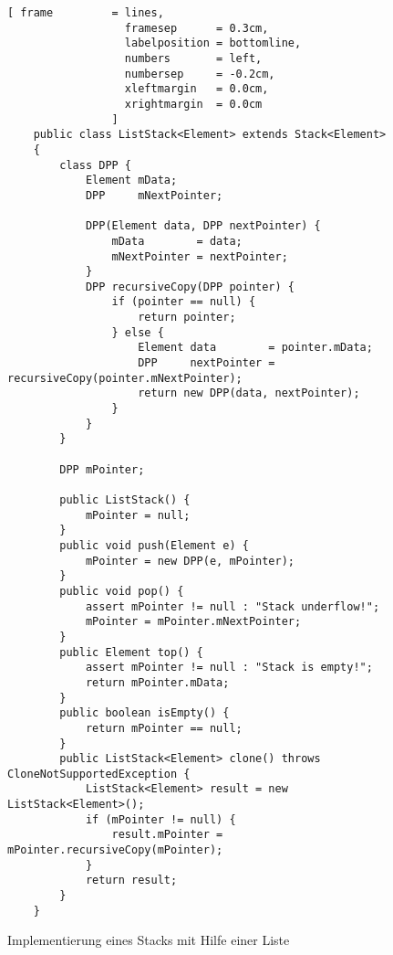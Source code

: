 \begin{figure}[!h]
  \centering
\begin{Verbatim}[ frame         = lines, 
                  framesep      = 0.3cm, 
                  labelposition = bottomline,
                  numbers       = left,
                  numbersep     = -0.2cm,
                  xleftmargin   = 0.0cm,
                  xrightmargin  = 0.0cm
                ]
    public class ListStack<Element> extends Stack<Element>
    {
        class DPP {
            Element mData;
            DPP     mNextPointer;

            DPP(Element data, DPP nextPointer) {
                mData        = data;
                mNextPointer = nextPointer;
            }            
            DPP recursiveCopy(DPP pointer) {
                if (pointer == null) {
                    return pointer;
                } else {
                    Element data        = pointer.mData;
                    DPP     nextPointer = recursiveCopy(pointer.mNextPointer);
                    return new DPP(data, nextPointer);
                }
            }
        }    

        DPP mPointer;
        
        public ListStack() {
            mPointer = null;
        }
        public void push(Element e) {
            mPointer = new DPP(e, mPointer);
        }        
        public void pop() {
            assert mPointer != null : "Stack underflow!";
            mPointer = mPointer.mNextPointer;
        }
        public Element top() {
            assert mPointer != null : "Stack is empty!";
            return mPointer.mData;
        }
        public boolean isEmpty() {
            return mPointer == null;
        }       
        public ListStack<Element> clone() throws CloneNotSupportedException {
            ListStack<Element> result = new ListStack<Element>();
            if (mPointer != null) {
                result.mPointer = mPointer.recursiveCopy(mPointer);
            }
            return result;
        }
    }
\end{Verbatim}
\vspace*{-0.3cm}
  \caption{Implementierung eines Stacks mit Hilfe einer Liste}
  \label{fig:ListStack.java}
\end{figure} 

